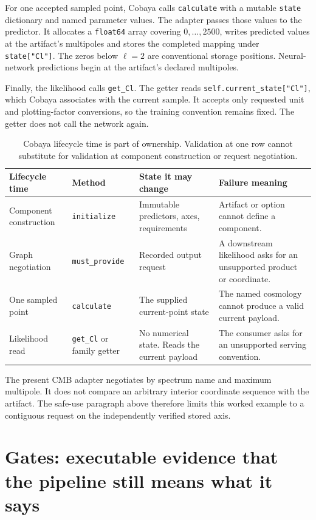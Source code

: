 \documentclass[10pt,aps,prd,twocolumn,nofootinbib]{revtex4-2}
\newcommand{\code}[1]{\texttt{#1}}
\begin{document}
For one accepted sampled point, Cobaya calls \code{calculate} with a mutable
\code{state} dictionary and named parameter values.  The adapter passes those
values to the predictor.  It allocates a \code{float64} array covering
$0,\ldots,2500$, writes predicted values at the artifact's multipoles and
stores the completed mapping under \code{state["Cl"]}.  The zeros below
$\ell=2$ are conventional storage positions.  Neural-network predictions begin
at the artifact's declared multipoles.

Finally, the likelihood calls \code{get\_Cl}.  The getter reads
\code{self.current\_state["Cl"]}, which Cobaya associates with the current
sample.  It accepts only requested unit and plotting-factor conversions, so
the training convention remains fixed.  The getter does not call the network
again.

\begin{table}[t]
\centering
\begin{tabular}{p{}p{}p{}p{}}
\toprule
Lifecycle time & Method & State it may change & Failure meaning \\
\midrule
Component construction & \code{initialize} & Immutable predictors, axes,
requirements & Artifact or option cannot define a component.  \\
Graph negotiation & \code{must\_provide} & Recorded output request & A
downstream likelihood asks for an unsupported product or coordinate.  \\
One sampled point & \code{calculate} & The supplied current-point state & The
named cosmology cannot produce a valid current payload.  \\
Likelihood read & \code{get\_Cl} or family getter & No numerical state.  Reads
the current payload & The consumer asks for an unsupported serving convention.  \\
\bottomrule
\end{tabular}
\caption{Cobaya lifecycle time is part of ownership.  Validation at one row
cannot substitute for validation at component construction or request
negotiation.}
\end{table}

The present CMB adapter negotiates by spectrum name and maximum multipole.  It
does not compare an arbitrary interior coordinate sequence with the artifact.
The safe-use paragraph above therefore limits this worked example to a
contiguous request on the independently verified stored axis.

\section{Gates: executable evidence that the pipeline still means what it says}
\label{chap:gates}
\end{document}
